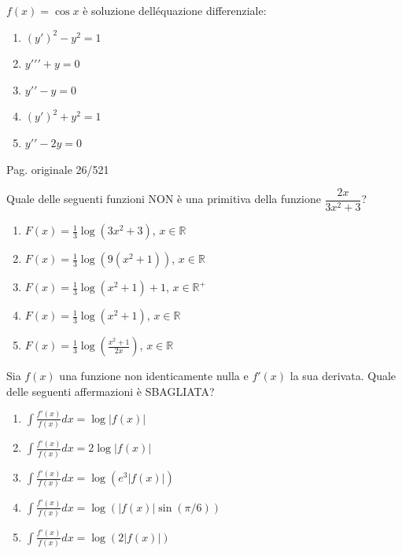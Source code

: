 \begin{quiz}
$f(x)=\cos x$ \`e soluzione dell\'equazione differenziale:
\begin{enumerate}[label=\alph*),leftmargin=1.3cm,itemsep=3pt,topsep=5pt]
\item $(y\prime)^2-y^2=1$
\item $y\prime\prime\prime+y=0$
\item $y\prime\prime-y=0$
\item $(y\prime)^2+y^2=1$
\item $y\prime\prime-2y=0$
\end{enumerate}
\end{quiz}

\par\noindent\hfill{\color{cyan!65!black}\scriptsize Pag. originale 26/521}\par\smallskip

\begin{quiz}
Quale delle seguenti funzioni NON \`e una primitiva della funzione $\dfrac{2x}{3x^2+3}$?
\begin{enumerate}[label=\alph*),leftmargin=1.3cm,itemsep=3pt,topsep=5pt]
\item $F(x)=\frac13\log(3x^2+3)$, $x\in\mathbb R$
\item $F(x)=\frac13\log(9(x^2+1))$, $x\in\mathbb R$
\item $F(x)=\frac13\log(x^2+1)+1$, $x\in\mathbb R^+$
\item $F(x)=\frac13\log(x^2+1)$, $x\in\mathbb R$
\item $F(x)=\frac13\log\left(\frac{x^2+1}{2x}\right)$, $x\in\mathbb R$
\end{enumerate}
\end{quiz}

\begin{quiz}
Sia $f(x)$ una funzione non identicamente nulla e $f\prime(x)$ la sua derivata. Quale delle seguenti affermazioni \`e SBAGLIATA?
\begin{enumerate}[label=\alph*),leftmargin=1.3cm,itemsep=3pt,topsep=5pt]
\item $\int\frac{f\prime(x)}{f(x)}dx=\log|f(x)|$
\item $\int\frac{f\prime(x)}{f(x)}dx=2\log|f(x)|$
\item $\int\frac{f\prime(x)}{f(x)}dx=\log(e^3|f(x)|)$
\item $\int\frac{f\prime(x)}{f(x)}dx=\log(|f(x)|\sin(\pi/6))$
\item $\int\frac{f\prime(x)}{f(x)}dx=\log(2|f(x)|)$
\end{enumerate}
\end{quiz}

